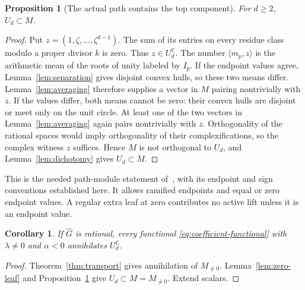 \documentclass[11pt]{article}
\numberwithin{equation}{section}
\newtheorem{proposition}[theorem]{Proposition}
\newtheorem{corollary}[theorem]{Corollary}
\theoremstyle{definition}\newtheorem{definition}[theorem]{Definition}
\theoremstyle{remark}\newtheorem{remark}[theorem]{Remark}
\newcommand{\C}{\mathbb C}
\newcommand{\HH}{\widehat G}
\newcommand{\UC}{U_d^{\C}}
\begin{document}
\begin{proposition}[The actual path contains the top component]
\label{prop:path-module}
For $d\ge2$, $U_d\subset M$.
\end{proposition}
\begin{proof}
Put $z=(1,\zeta,\ldots,\zeta^{d-1})$. The sum of its entries on every
residue class modulo a proper divisor $k$ is zero. Thus $z\in\UC$.
The number $\langle m_p,z\rangle$ is the arithmetic mean of the roots
of unity labeled by $I_p$.
If the endpoint values agree, Lemma~\ref{lem:separation} gives disjoint
convex hulls, so these two means differ. Lemma~\ref{lem:averaging}
therefore supplies a vector in $M$ pairing nontrivially with $z$.
If the values differ, both means cannot be zero: their convex hulls
are disjoint or meet only on the unit circle. At least one of the two
vectors in Lemma~\ref{lem:averaging} again pairs nontrivially with $z$.
Orthogonality of the rational spaces would imply orthogonality of
their complexifications, so the complex witness $z$ suffices.
Hence $M$ is not orthogonal to $U_d$, and Lemma~\ref{lem:dichotomy}
gives $U_d\subset M$.
\end{proof}
This is the needed path-module statement of~\cite[Proposition~4.1]{PM},
with its endpoint and sign conventions established here. It allows
ramified endpoints and equal or zero endpoint values. A regular extra
leaf at zero contributes no active lift unless it is an endpoint value.

\begin{corollary}\label{cor:annihilation}
If $\HH$ is rational, every functional \eqref{eq:coefficient-functional}
with $\lambda\ne0$ and $\alpha<0$ annihilates $\UC$.
\end{corollary}
\begin{proof}
Theorem~\ref{thm:transport} gives annihilation of $M_{\ne0}$.
Lemma~\ref{lem:zero-leaf} and Proposition~\ref{prop:path-module} give
$U_d\subset M=M_{\ne0}$. Extend scalars.
\end{proof}
\end{document}
